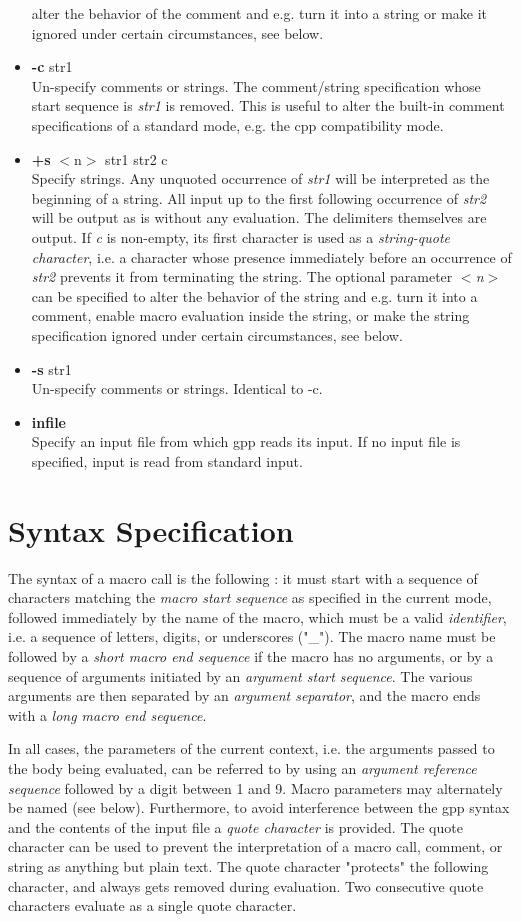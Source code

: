 \begin{itemize}
alter the behavior of the comment and e.g. turn it into a string or make it
ignored under certain circumstances, see below.
\item
{\bf -c } str1\\
Un-specify comments or strings. The comment/string specification whose 
start sequence is {\it str1} is removed. This is useful to alter the 
built-in comment specifications of a standard mode, e.g. the cpp 
compatibility mode.
\item
{\bf +s} $<$n$>$ str1 str2 c\\
Specify strings. Any unquoted occurrence of {\it str1} will be
interpreted as the beginning of a string. All input up to the first 
following occurrence of {\it str2} will be output as is without any
evaluation. The delimiters themselves are output. If {\it c} is non-empty,
its first character is used as a {\it string-quote character}, i.e. a
character whose presence immediately before an occurrence of {\it str2}
prevents it from terminating the string.  
The optional parameter {\it $<$n$>$} can be specified to
alter the behavior of the string and e.g. turn it into a comment, enable
macro evaluation inside the string, or make the string specification 
ignored under certain circumstances, see below.
\item
{\bf -s } str1\\
Un-specify comments or strings. Identical to -c.
\item
{\bf infile} \\
Specify an input file from which gpp reads its input. If no input
file is specified, input is read from standard input.
\end{itemize}
\section{Syntax Specification}


The syntax of a macro call is the following : it must start with a
sequence of characters matching the {\it macro start sequence} as specified
in the current mode, followed immediately by the name of the macro, which
must be a valid {\it identifier}, i.e. a sequence of letters, digits, or
underscores ("\_"). The macro name must be followed by a {\it short macro end
sequence} if the macro has no arguments, or by a sequence of arguments
initiated by an {\it argument start sequence}. The various arguments are
then separated by an {\it argument separator}, and the macro ends with
a {\it long macro end sequence}.


In all cases, the parameters of the current context, i.e. the arguments
passed to the body being evaluated, can be referred to by using an
{\it argument reference sequence} followed by a digit between 1 and 9.
Macro parameters may alternately be named (see below). Furthermore, to
avoid interference between the gpp syntax and the contents of the input file
a {\it quote character} is provided. The quote character can be used to
prevent the interpretation of a macro call, comment, or string as anything
but plain text. The quote character "protects" the following character, and
always gets removed during evaluation. Two consecutive quote characters
evaluate as a single quote character.


